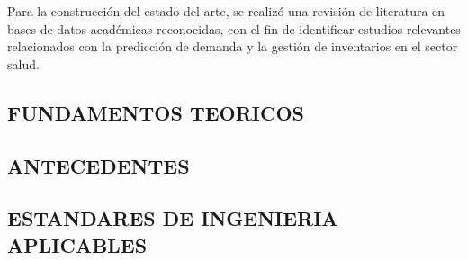 Para la construcción del estado del arte, se realizó una revisión de literatura en bases de datos académicas reconocidas, con el fin de identificar estudios relevantes relacionados con la predicción de demanda y la gestión de inventarios en el sector salud.



\subsection{FUNDAMENTOS TEORICOS}


\subsection{ANTECEDENTES}


\subsection{ESTANDARES DE INGENIERIA APLICABLES}

